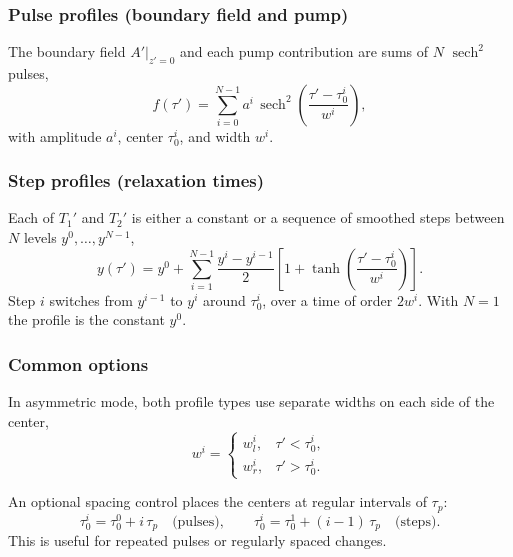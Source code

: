 \documentclass[12pt,a4paper]{article}
\newcommand{\sech}{\operatorname{sech}}
\begin{document}
\subsubsection*{Pulse profiles (boundary field and pump)}

The boundary field $A'\vert_{z'=0}$ and each pump contribution are sums of
$N$ $\sech^2$ pulses,
\begin{equation}
  f(\tau') = \sum_{i=0}^{N-1} a^i\,\sech^2\!\left(\frac{\tau'-\tau_0^{i}}{w^{i}}\right),
\end{equation}
with amplitude $a^i$, center $\tau_0^i$, and width $w^i$.

\subsubsection*{Step profiles (relaxation times)}

Each of $T_1'$ and $T_2'$ is either a constant or a sequence of smoothed
steps between $N$ levels $y^0, \dots, y^{N-1}$,
\begin{equation}
  y(\tau') = y^0 + \sum_{i=1}^{N-1}
  \frac{y^i - y^{i-1}}{2}
  \left[1 + \tanh\!\left(\frac{\tau'-\tau_0^i}{w^i}\right)\right].
\end{equation}
Step $i$ switches from $y^{i-1}$ to $y^i$ around $\tau_0^i$, over a time
of order $2w^i$. With $N = 1$ the profile is the constant $y^0$.

\subsubsection*{Common options}

In asymmetric mode, both profile types use separate widths on each side of
the center,
\begin{equation}
  w^i =
  \begin{cases}
    w_l^i, & \tau' < \tau_0^i,\\
    w_r^i, & \tau' > \tau_0^i.
  \end{cases}
\end{equation}

An optional spacing control places the centers at regular intervals of
$\tau_p$:
\begin{equation}
  \tau_0^i = \tau_0^0 + i\,\tau_p \quad\text{(pulses)},
  \qquad
  \tau_0^i = \tau_0^1 + (i-1)\,\tau_p \quad\text{(steps)}.
\end{equation}
This is useful for repeated pulses or regularly spaced changes.
\end{document}
